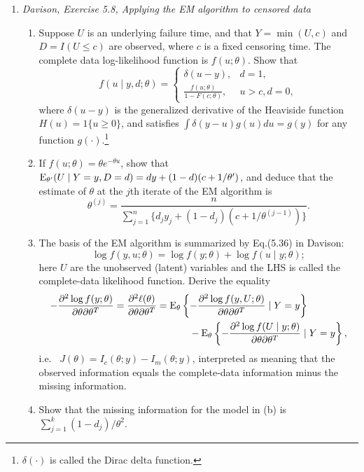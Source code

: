 \documentclass[12pt]{article}
\def\E{{\rm E}}
\newcommand{\1}{\mathds 1}
\begin{document}
\begin{enumerate}
\textcolor{red}{
(d) When $\rho = 0$, 
\begin{equation*}
	\ell(\mu, 0, \sigma^2) = \sum_{j=1}^k \left[-\frac 12 \log \sigma^2 + \frac{n_j}{2\sigma^2}(\hat\mu_j - \mu)^2\right]
\end{equation*}
Differentiating wrt $\mu$ yields 
\begin{equation*}
	\frac{\partial \ell}{\partial \mu} = \sum_{j=1}^k \frac{n_j}{\sigma^2}(\mu - \hat\mu_j) = 0
\end{equation*}
Solving yields an MLE for $\mu$ of 
\begin{equation*}
	\hat\mu = \frac{\sum_{j=1}^k n_j \hat\mu_j}{\sum_{j=1}^k n_j}
\end{equation*}
as required. 
}

\item{\it Davison, Exercise 5.8, Applying the EM algorithm to censored data}
\begin{enumerate}
	\item Suppose $U$ is an underlying failure time, and that $Y=\min(U, c)$ and $D = I(U\le c)$ are observed, where $c$ is a fixed censoring time. The complete data log-likelihood function is $f(u;\theta)$. Show that $$f(u\mid y,d;\theta) = \begin{cases} \delta(u-y),&d=1, \\ \frac{f(u;\theta)}{1-F(c;\theta)}, & u>c, d=0, \end{cases}$$ where $\delta(u-y)$ is  the generalized derivative of the Heaviside function $H(u) = 1\{u\ge 0\}$, and satisfies $\int \delta(y-u)g(u)du = g(y)$ for any function $g(\cdot)$.\footnote{$\delta(\cdot)$ is called the Dirac delta function.}
	\item If $f(u;\theta) = \theta e^{-\theta u}$, show that $\E_{\theta'}(U\mid Y=y, D=d) = dy +(1-d)(c+1/\theta')$, and deduce that the estimate of $\theta$ at the $j$th iterate of the EM algorithm is $$\theta^{(j)} = \frac{n}{\sum_{j=1}^n\{d_jy_j + (1-d_j)(c+1/\theta^{ (j-1)})\}}.$$
	\item The basis of the EM algorithm is summarized by Eq.(5.36) in Davison: $$\log f(y,u;\theta) = \log f(y;\theta) + \log f(u\mid y;\theta);$$ here $U$ are the unobserved (latent) variables and the LHS is called the complete-data likelihood function.   Derive the equality 
    \begin{align*}
         -\frac{\partial^2\log f(y;\theta)}{\partial\theta\partial\theta^T} = \frac{\partial^2\ell(\theta)}{\partial\theta\partial\theta^T} &= \E_\theta\left\{-\frac{\partial^2\log f(y,U;\theta)}{\partial\theta\partial\theta^T}\mid Y=y \right\} \\ 
	    & ~~~~~~~~~~-\E_\theta\left\{-\frac{\partial^2\log f(U\mid y;\theta)}{\partial\theta\partial\theta^T}\mid Y=y\right\},
	\end{align*}
	i.e.~ $J(\theta) = I_c(\theta;y) - I_m(\theta;y)$, interpreted as meaning that the observed information equals the complete-data information minus the missing information.
	\item Show that the missing information for the model in (b) is $\sum_{j=1}^k(1-d_j)/\theta^2$. 
\end{enumerate}


\end{enumerate}
\end{document}
